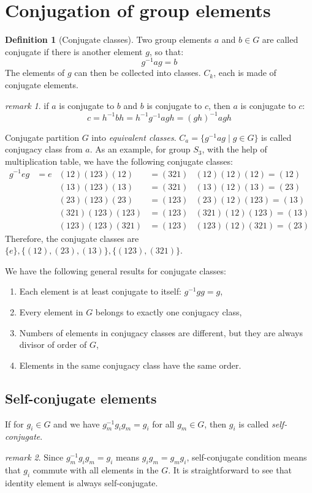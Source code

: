 \documentclass{amsart}
\theoremstyle{remark}
\newtheorem*{remark}{remark}
\theoremstyle{remark}
\theoremstyle{definition}
\newtheorem*{definition}{Definition}
\begin{document}
\vspace{10pt}
\section*{Conjugation of group elements}

\begin{definition}
    [Conjugate classes]
    Two group elements $a$ and $b\in G$ are called conjugate if there is another element $g$, so that:
    \[g^{-1}ag = b\]
    The elements of $g$ can then be collected into classes. $C_k$, each is made of conjugate elements. 
\end{definition}
\begin{remark}
    if $a$ is conjugate to $b$ and $b$ is conjugate to $c$, then $a$ is conjugate to $c$:
    \[ c = h^{-1}bh = h^{-1}g^{-1}agh = (gh)^{-1}a gh \]
\end{remark}
Conjugate partition $G$ into \emph{equivalent classes}. $C_a = \{g^{-1}ag\mid g\in G\}$ is called conjugacy class 
from $a$. 
As an example, for group $S_3$, with the help of multiplication table, we have the following conjugate classes:
\begin{align*}
    g^{-1}eg &= e  & (12)(123)(12) &= (321) & (12)(12)(12) = (12) \\
    &&  (13)(123)(13) &= (321) & (13)(12)(13) = (23) \\
    &&  (23)(123)(23) &= (123) & (23)(12)(123) = (13) \\
    &&  (321)(123)(123) &= (123) & (321)(12)(123) = (13) \\
    &&  (123)(123)(321) &= (123) & (123)(12)(321) = (23)
\end{align*}
Therefore, the conjugate classes are $\{e\}, \{(12),(23),(13)\}, \{(123),(321)\}$. 

We have the following general results for conjugate classes:
\begin{enumerate}
    \item Each element is at least conjugate to itself: $g^{-1}gg = g$,
    \item Every element in $G$ belongs to exactly one conjugacy class,
    \item Numbers of elements in conjugacy classes are different, but they are always divisor of order of $G$,
    \item Elements in the same conjugacy class have the same order.
\end{enumerate}

\subsection*{Self-conjugate elements}
If for $g_i\in G$ and we have $g_m^{-1}g_i g_m = g_i$ for all $g_m \in G$, then $g_i$ is called \emph{self-conjugate}.
\begin{remark}
    Since $g_m^{-1}g_i g_m = g_i$ means $g_i g_m = g_m g_i$, self-conjugate condition means that $g_i$ commute with all 
    elements in the $G$. 
    It is straightforward to see that identity element is always self-conjugate. 
\end{remark}
\end{document}
